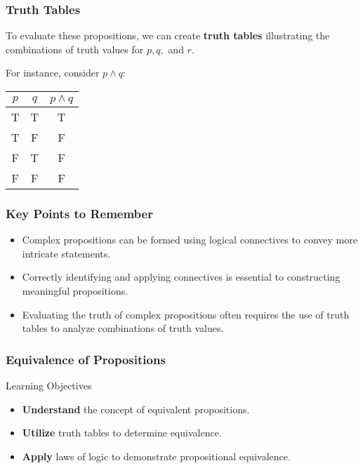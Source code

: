 \documentclass[aspectratio=169]{beamer}
\begin{document}
\begin{frame}[fragile]
    \frametitle{Truth Tables}
    To evaluate these propositions, we can create \textbf{truth tables} illustrating the combinations of truth values for \( p, q, \) and \( r \).

    For instance, consider \( p \land q \):

    \begin{center}
    \begin{tabular}{|c|c|c|}
        \hline
        \( p \) & \( q \) & \( p \land q \) \\
        \hline
        T       & T       & T                \\
        T       & F       & F                \\
        F       & T       & F                \\
        F       & F       & F                \\
        \hline
    \end{tabular}
    \end{center}
\end{frame}

\begin{frame}[fragile]
    \frametitle{Key Points to Remember}
    \begin{itemize}
        \item Complex propositions can be formed using logical connectives to convey more intricate statements.
        \item Correctly identifying and applying connectives is essential to constructing meaningful propositions.
        \item Evaluating the truth of complex propositions often requires the use of truth tables to analyze combinations of truth values.
    \end{itemize}
\end{frame}

\begin{frame}[fragile]
    \frametitle{Equivalence of Propositions}
    \begin{block}{Learning Objectives}
        \begin{itemize}
            \item \textbf{Understand} the concept of equivalent propositions.
            \item \textbf{Utilize} truth tables to determine equivalence.
            \item \textbf{Apply} laws of logic to demonstrate propositional equivalence.
        \end{itemize}
    \end{block}
\end{frame}
\end{document}
